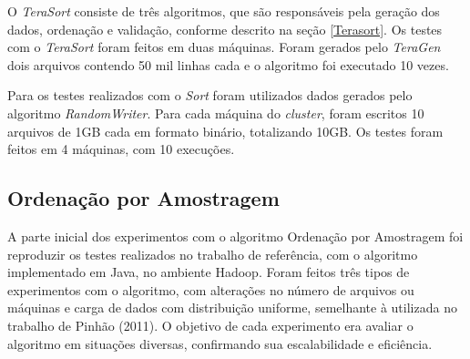 
O \textit{TeraSort} consiste de três algoritmos, que são responsáveis pela geração dos dados, ordenação e validação, conforme descrito na seção \ref{Terasort}.
Os testes com o \textit{TeraSort} foram feitos em duas máquinas. Foram gerados pelo \textit{TeraGen} dois arquivos contendo 50 mil linhas cada e o algoritmo foi executado 10 vezes.

 



Para os testes realizados com o \textit{Sort} foram utilizados dados gerados pelo algoritmo \textit{RandomWriter}. Para cada máquina do \textit{cluster}, foram escritos 10 arquivos de 1GB cada em formato binário, totalizando 10GB. Os testes foram feitos em 4 máquinas, com 10 execuções. 


\subsection{Ordenação por Amostragem}

A parte inicial dos experimentos com o algoritmo Ordenação por Amostragem foi reproduzir os testes realizados no trabalho de referência, com o algoritmo implementado em Java, no ambiente Hadoop. 
Foram feitos três tipos de experimentos com o algoritmo, com alterações no número de arquivos ou máquinas e carga de dados com distribuição uniforme, semelhante à utilizada no trabalho de Pinhão (2011). 
O objetivo de cada experimento era avaliar o algoritmo em situações diversas, confirmando sua escalabilidade e eficiência.


